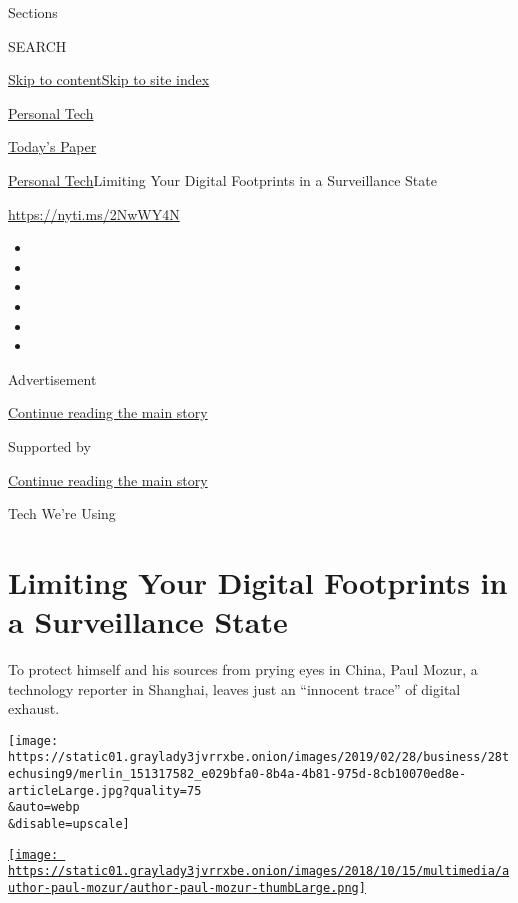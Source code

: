 Sections

SEARCH

\protect\hyperlink{site-content}{Skip to
content}\protect\hyperlink{site-index}{Skip to site index}

\href{https://www.nytimes3xbfgragh.onion/section/technology/personaltech}{Personal
Tech}

\href{https://myaccount.nytimes3xbfgragh.onion/auth/login?response_type=cookie\&client_id=vi}{}

\href{https://www.nytimes3xbfgragh.onion/section/todayspaper}{Today's
Paper}

\href{/section/technology/personaltech}{Personal Tech}\textbar{}Limiting
Your Digital Footprints in a Surveillance State

\url{https://nyti.ms/2NwWY4N}

\begin{itemize}
\item
\item
\item
\item
\item
\item
\end{itemize}

Advertisement

\protect\hyperlink{after-top}{Continue reading the main story}

Supported by

\protect\hyperlink{after-sponsor}{Continue reading the main story}

Tech We're Using

\hypertarget{limiting-your-digital-footprints-in-a-surveillance-state}{%
\section{Limiting Your Digital Footprints in a Surveillance
State}\label{limiting-your-digital-footprints-in-a-surveillance-state}}

To protect himself and his sources from prying eyes in China, Paul
Mozur, a technology reporter in Shanghai, leaves just an ``innocent
trace'' of digital exhaust.

\texttt{[image: https://static01.graylady3jvrrxbe.onion/images/2019/02/28/business/28techusing9/merlin\_151317582\_e029bfa0-8b4a-4b81-975d-8cb10070ed8e-articleLarge.jpg?quality=75\\\&auto=webp\\\&disable=upscale]}

\href{https://www.nytimes3xbfgragh.onion/by/paul-mozur}{\texttt{[image: https://static01.graylady3jvrrxbe.onion/images/2018/10/15/multimedia/author-paul-mozur/author-paul-mozur-thumbLarge.png]}}

